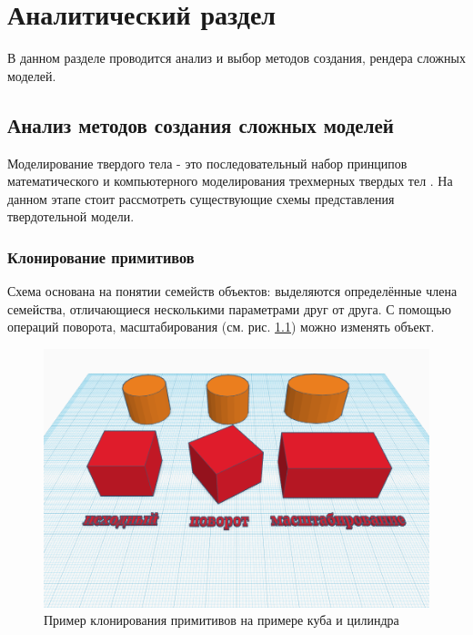 \chapter{Аналитический раздел}
\label{cha:analysis}

В данном разделе проводится анализ и выбор методов создания, рендера сложных моделей.  

\section{Анализ методов создания сложных моделей}

Моделирование твердого тела - это последовательный набор принципов математического и компьютерного моделирования трехмерных твердых тел \cite{lec:modeling_schemes}. 
На данном этапе стоит рассмотреть существующие схемы представления твердотельной модели.

\subsection{Клонирование примитивов}
Схема основана на понятии семейств объектов: выделяются определённые члена семейства, отличающиеся несколькими параметрами друг от друга. 
С помощью операций поворота, масштабирования (см. рис. \ref{fig:primitive_instancing}) можно изменять объект.
\begin{figure}
  \centering
  \includegraphics[scale=0.3]{inc/img/primitive_instancing}
  \caption{Пример клонирования примитивов на примере куба и цилиндра}
  \label{fig:primitive_instancing}
\end{figure}

